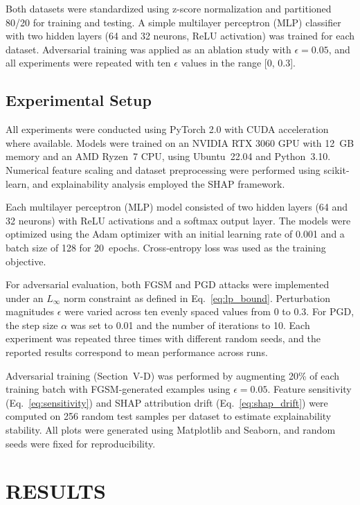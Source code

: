 \documentclass[a4paper,twoside]{article}
\begin{document}
Both datasets were standardized using z-score normalization and partitioned 80/20 
for training and testing. 
A simple multilayer perceptron (MLP) classifier with two hidden layers 
(64 and 32 neurons, ReLU activation) was trained for each dataset. 
Adversarial training was applied as an ablation study with $\epsilon = 0.05$, 
and all experiments were repeated with ten $\epsilon$ values in the range [0, 0.3].

\subsection{Experimental Setup}

All experiments were conducted using PyTorch 2.0 with CUDA acceleration where available. 
Models were trained on an NVIDIA RTX 3060 GPU with 12~GB memory and an AMD Ryzen~7 CPU, 
using Ubuntu~22.04 and Python~3.10. 
Numerical feature scaling and dataset preprocessing were performed using 
scikit-learn, and explainability analysis employed the SHAP framework.

Each multilayer perceptron (MLP) model consisted of two hidden layers 
(64 and 32 neurons) with ReLU activations and a softmax output layer. 
The models were optimized using the Adam optimizer with an initial learning rate of 0.001 
and a batch size of 128 for 20~epochs. 
Cross-entropy loss was used as the training objective.

For adversarial evaluation, both FGSM and PGD attacks were implemented under 
an $L_\infty$ norm constraint as defined in Eq.~\ref{eq:lp_bound}. 
Perturbation magnitudes $\epsilon$ were varied across ten evenly spaced values 
from 0 to 0.3. 
For PGD, the step size $\alpha$ was set to 0.01 and the number of iterations to 10. 
Each experiment was repeated three times with different random seeds, 
and the reported results correspond to mean performance across runs.

Adversarial training (Section~V-D) was performed by augmenting 20\% of each training batch 
with FGSM-generated examples using $\epsilon=0.05$. 
Feature sensitivity (Eq.~\ref{eq:sensitivity}) and SHAP attribution drift (Eq.~\ref{eq:shap_drift}) 
were computed on 256 random test samples per dataset to estimate explainability stability. 
All plots were generated using Matplotlib and Seaborn, and random seeds were fixed 
for reproducibility.

\section{\uppercase{Results}}
\end{document}
